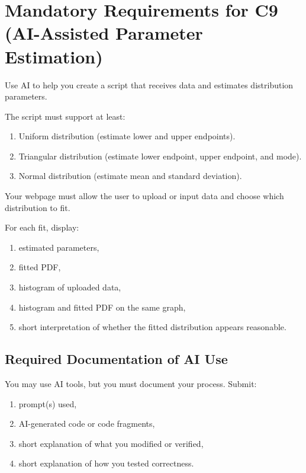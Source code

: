 	\section{Mandatory Requirements for C9 (AI-Assisted Parameter Estimation)}
	Use AI to help you create a script that receives data and estimates distribution parameters.
	
	The script must support at least:
	\begin{enumerate}
		\item Uniform distribution (estimate lower and upper endpoints).
		\item Triangular distribution (estimate lower endpoint, upper endpoint, and mode).
		\item Normal distribution (estimate mean and standard deviation).
	\end{enumerate}
	
	Your webpage must allow the user to upload or input data and choose which distribution to fit.
	
	For each fit, display:
	\begin{enumerate}
		\item estimated parameters,
		\item fitted PDF,
		\item histogram of uploaded data,
		\item histogram and fitted PDF on the same graph,
		\item short interpretation of whether the fitted distribution appears reasonable.
	\end{enumerate}

	\subsection*{Required Documentation of AI Use}
	You may use AI tools, but you must document your process. Submit:
	\begin{enumerate}
		\item prompt(s) used,
		\item AI-generated code or code fragments,
		\item short explanation of what you modified or verified,
		\item short explanation of how you tested correctness.
	\end{enumerate}

